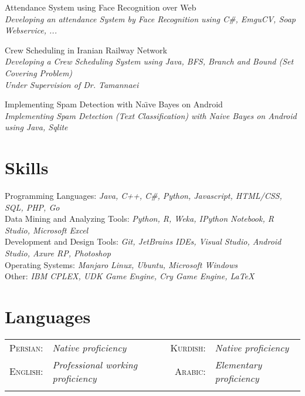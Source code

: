 \documentclass[a4paper,10pt]{article}
\newcommand{\skillItem}[2]{
	\textbullet\textnormal{ #1: }\emph{\color{darkgray}\small #2}}
\newcommand{\langItem}[2]{
	\textsc{ #1:}&\emph{\color{darkgray}#2}}
\newcommand{\projectTitle}[1]{
	\textbullet\textnormal{ #1}}
\newcommand{\projectSubTitle}[1]{
	\emph{\color{darkgray}\small {\space\space\space\space\space}#1}}
\newcommand{\latexLogo}{
	{\fb \LaTeX}\setmainfont[SmallCapsFont=Fontin-SmallCaps.otf]{Fontin.otf}}
\begin{document}
		\projectTitle{ Attendance System using Face Recognition over Web} \\
		\projectSubTitle{Developing an attendance System by Face Recognition using C\#, EmguCV, Soap Webservice, ...} \vspace{1 mm}
		
		\projectTitle{ Crew Scheduling in Iranian Railway Network} \\
		\projectSubTitle{Developing a Crew Scheduling System using Java, BFS, Branch and Bound (Set Covering Problem)}\\
		\projectSubTitle{Under Supervision of Dr. Tamannaei} \vspace{1 mm}
		
		\projectTitle{ Implementing Spam Detection with Na{\"\i}ve Bayes on Android} \\
		\projectSubTitle{Implementing Spam Detection (Text Classification) with Naive Bayes on Android using Java, Sqlite} \vspace{1 mm}
	\section{Skills}
		\skillItem{Programming Languages}{Java, C++, {C\#}, Python, Javascript, HTML/CSS, SQL, PHP, Go}\vspace{1 mm}\\
		\skillItem{Data Mining and Analyzing Tools}{Python, R, Weka, IPython Notebook, R Studio, Microsoft Excel}\vspace{1 mm}\\
		\skillItem{Development and Design Tools}{Git, JetBrains IDEs, Visual Studio, Android Studio, Axure RP, Photoshop}\vspace{1 mm}\\
		\skillItem{Operating Systems}{Manjaro Linux, Ubuntu, Microsoft Windows}\vspace{1 mm}\\
		\skillItem{Other}{IBM CPLEX, UDK Game Engine, Cry Game Engine, \latexLogo}\vspace{1 mm}
	 
	\section{Languages}
		 \begin{tabular}{rl  rl}
		 	\langItem{Persian}{Native proficiency} & \langItem{ Kurdish}{Native proficiency}\\
		 	\langItem{ English}{Professional working proficiency} & \langItem{ Arabic}{Elementary proficiency}\\\\
		 \end{tabular}
\end{document}
